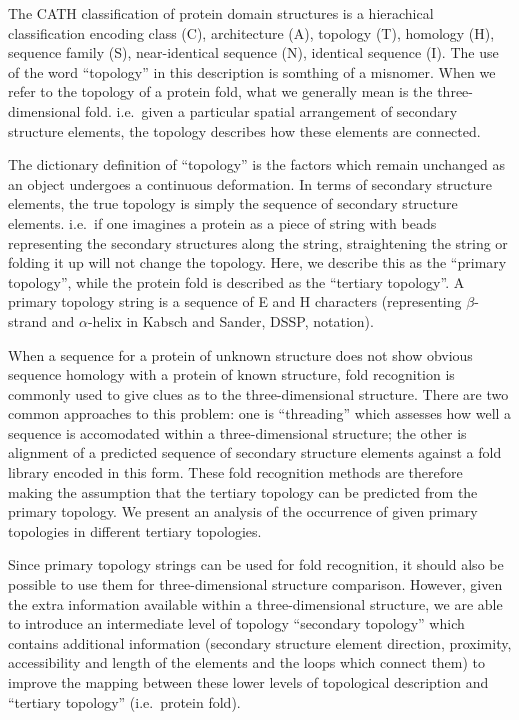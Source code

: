 \documentclass{article}
\begin{document}
The CATH classification of protein domain structures is a hierachical
classification encoding class (C), architecture (A), topology (T),
homology (H), sequence family (S), near-identical sequence (N),
identical sequence (I). The use of the word ``topology'' in this
description is somthing of a misnomer. When we refer to the topology
of a protein fold, what we generally mean is the three-dimensional
fold. i.e.\ given a particular spatial arrangement of secondary
structure elements, the topology describes how these elements are
connected.

The dictionary definition of ``topology'' is the factors which remain
unchanged as an object undergoes a continuous deformation.  In terms
of secondary structure elements, the true topology is simply the
sequence of secondary structure elements.  i.e.\ if one imagines a
protein as a piece of string with beads representing the secondary
structures along the string, straightening the string or folding it up
will not change the topology.  Here, we describe this as the ``primary
topology'', while the protein fold is described as the ``tertiary
topology''. A primary topology string is a sequence of E and H
characters (representing $\beta$-strand and $\alpha$-helix in Kabsch
and Sander, DSSP, notation).

When a sequence for a protein of unknown structure does not show
obvious sequence homology with a protein of known structure, fold
recognition is commonly used to give clues as to the three-dimensional
structure. There are two common approaches to this problem: one is
``threading'' which assesses how well a sequence is accomodated within
a three-dimensional structure; the other is alignment of a predicted
sequence of secondary structure elements against a fold library
encoded in this form.  These fold recognition methods are therefore
making the assumption that the tertiary topology can be predicted from
the primary topology. We present an analysis of the occurrence of
given primary topologies in different tertiary topologies.

Since primary topology strings can be used for fold recognition, it
should also be possible to use them for three-dimensional structure
comparison.  However, given the extra information available within a
three-dimensional structure, we are able to introduce an intermediate
level of topology ``secondary topology'' which contains additional
information (secondary structure element direction, proximity,
accessibility and length of the elements and the loops which connect
them) to improve the mapping between these lower levels of topological
description and ``tertiary topology'' (i.e.\ protein fold).
\end{document}
